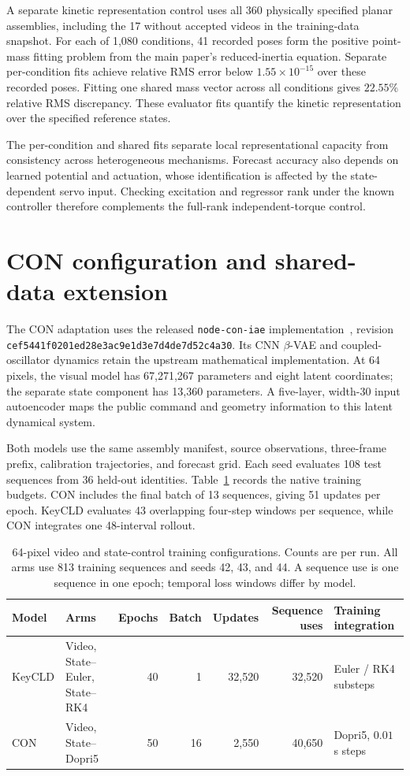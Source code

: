 \documentclass[10pt,twocolumn,letterpaper]{article}
\begin{document}
A separate kinetic representation control uses all 360 physically specified planar assemblies, including the 17 without accepted videos in the training-data snapshot. For each of 1,080 conditions, 41 recorded poses form the positive point-mass fitting problem from the main paper's reduced-inertia equation. Separate per-condition fits achieve relative RMS error below $1.55\times10^{-15}$ over these recorded poses. Fitting one shared mass vector across all conditions gives $22.55\%$ relative RMS discrepancy. These evaluator fits quantify the kinetic representation over the specified reference states.

The per-condition and shared fits separate local representational capacity from consistency across heterogeneous mechanisms. Forecast accuracy also depends on learned potential and actuation, whose identification is affected by the state-dependent servo input. Checking excitation and regressor rank under the known controller therefore complements the full-rank independent-torque control.

\section{CON configuration and shared-data extension}
\label{app:con}
The CON adaptation uses the released \texttt{node-con-iae} implementation~\cite{stolzle2024con}, revision \texttt{cef5441f0201ed28e3ac9e1d3e7d4de7d52c4a30}. Its CNN $\beta$-VAE and coupled-oscillator dynamics retain the upstream mathematical implementation. At 64 pixels, the visual model has 67,271,267 parameters and eight latent coordinates; the separate state component has 13,360 parameters. A five-layer, width-30 input autoencoder maps the public command and geometry information to this latent dynamical system.

Both models use the same assembly manifest, source observations, three-frame prefix, calibration trajectories, and forecast grid. Each seed evaluates 108 test sequences from 36 held-out identities. Table~\ref{app:two-model-budget} records the native training budgets. CON includes the final batch of 13 sequences, giving 51 updates per epoch. KeyCLD evaluates 43 overlapping four-step windows per sequence, while CON integrates one 48-interval rollout.

\begin{table}[t]
\caption{64-pixel video and state-control training configurations. Counts are per run. All arms use 813 training sequences and seeds 42, 43, and 44. A sequence use is one sequence in one epoch; temporal loss windows differ by model.}
\label{app:two-model-budget}
\centering\small
\begin{tabular}{llrrrrl}
\toprule
Model & Arms & Epochs & Batch & Updates & Sequence uses & Training integration\\
\midrule
KeyCLD & Video, State--Euler, State--RK4 & 40 & 1 & 32,520 & 32,520 & Euler / RK4 substeps\\
CON & Video, State--Dopri5 & 50 & 16 & 2,550 & 40,650 & Dopri5, $0.01$ s steps\\
\bottomrule
\end{tabular}
\end{table}
\end{document}
